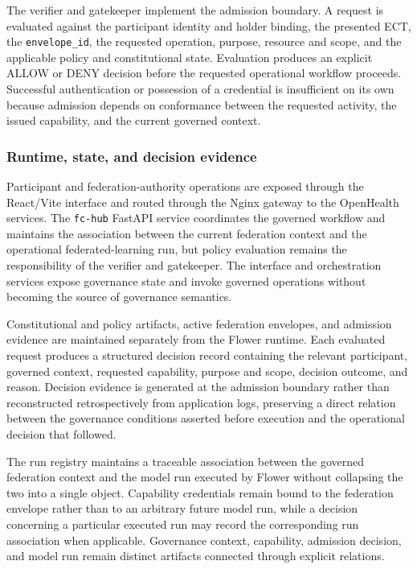 \documentclass[twoside,11pt]{article}
\begin{document}
The verifier and gatekeeper implement the admission boundary. A request is evaluated against the participant identity and holder binding, the presented ECT, the \texttt{envelope\_id}, the requested operation, purpose, resource and scope, and the applicable policy and constitutional state. Evaluation produces an explicit ALLOW or DENY decision before the requested operational workflow proceeds. Successful authentication or possession of a credential is   insufficient on its own because admission depends on conformance between the requested activity, the issued capability, and the current governed context.

\subsubsection{Runtime, state, and decision evidence}
Participant and federation-authority operations are exposed through the React/Vite interface and routed through the Nginx gateway to the OpenHealth services. The \texttt{fc-hub} FastAPI service coordinates the governed workflow and maintains the association between the current federation context and the operational federated-learning run, but policy evaluation remains the responsibility of the verifier and gatekeeper. The interface and orchestration services  expose governance state and invoke governed operations without becoming the source of governance semantics.

Constitutional and policy artifacts, active federation envelopes, and admission evidence are maintained separately from the Flower runtime. Each evaluated request produces a structured decision record containing the relevant participant, governed context, requested capability, purpose and scope, decision outcome, and reason. Decision evidence is generated at the admission boundary rather than reconstructed retrospectively from application logs,  preserving a direct relation between the governance conditions asserted before execution and the operational decision that followed.

The run registry maintains a traceable association between the governed federation context and the model run executed by Flower without collapsing the two into a single object. Capability credentials remain bound to the federation envelope rather than to an arbitrary future model run, while a decision concerning a particular executed run may record the corresponding run association when applicable. Governance context, capability, admission decision, and model run   remain distinct artifacts connected through explicit relations.
\end{document}
